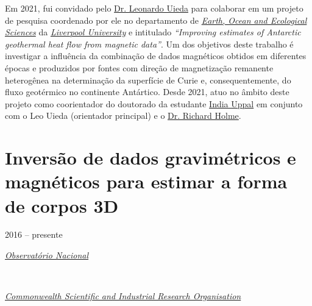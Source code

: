 \bigskip

\noindent Em 2021, fui convidado pelo 
\href{https://www.liverpool.ac.uk/environmental-sciences/staff/leonardo-uieda/}{Dr. Leonardo Uieda} 
para colaborar em um projeto de pesquisa coordenado por ele no departamento de
\href{https://www.liverpool.ac.uk/earth-ocean-and-ecological-sciences/}{\textit{Earth, Ocean and Ecological Sciences}} da 
\href{https://www.liverpool.ac.uk/}{\textit{Liverpool University}} e 
intitulado 
\textit{``Improving estimates of Antarctic geothermal heat flow from magnetic data''}. 
Um dos objetivos deste trabalho é investigar a influência da combinação de dados
magnéticos obtidos em diferentes épocas e produzidos por fontes com direção de magnetização
remanente heterogênea na determinação da superfície de Curie e, consequentemente, do
fluxo geotérmico no continente Antártico.
Desde 2021, atuo no âmbito deste projeto como 
coorientador do doutorado da estudante  
\href{https://orcid.org/0000-0003-3531-2656}{India Uppal} em conjunto com o Leo Uieda
(orientador principal) e o 
\href{https://www.liverpool.ac.uk/environmental-sciences/staff/richard-holme/}{Dr. Richard Holme}.

\section{Inversão de dados gravimétricos e magnéticos para estimar a forma de corpos 3D} 
\label{sec:projeto-bolachinhas}

2016 -- presente
\vspace{0.3\baselineskip}\\
\noindent\parbox{0.03\textwidth}{\vspace{-0.2\baselineskip}\faUniversity} \href{https://www.gov.br/observatorio/pt-br}{\textsl{Observatório Nacional}}
\parbox{0.03\textwidth}{\vspace{-0.2\baselineskip} \hfill {}} \\
\noindent\parbox{0.03\textwidth}{\vspace{-0.2\baselineskip}\faUniversity}
\href{https://www.csiro.au/}{\textsl{Commonwealth Scientific and Industrial Research Organisation}}
\parbox{0.04\textwidth}{\vspace{-0.2\baselineskip} \hfill {}}

